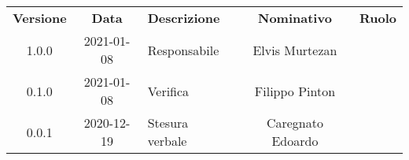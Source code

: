 {
    \renewcommand{\arraystretch}{1.5}
    \centering
    \begin{longtable}{ c c  C{4cm}  c  c }
        \rowcolor{\primaryColor}
        \textcolor{\secondaryColor}{
        \textbf{Versione}}     & \textcolor{\secondaryColor}{\textbf{Data}}       & \textcolor{\secondaryColor}
        {\textbf{Descrizione}} & \textcolor{\secondaryColor}{\textbf{Nominativo}} & \textcolor{\secondaryColor}{\textbf{Ruolo}}                          \\


        1.0.0                  & 2021-01-08                                       & Responsabile                                & Elvis Murtezan & \responsabile{} \\
        0.1.0                  & 2021-01-08                                      & Verifica                                    & Filippo Pinton & \verificatore{} \\
        0.0.1                  & 2020-12-19                                       & Stesura verbale                            & Caregnato Edoardo & \redattore{}    \\
    \end{longtable}
}